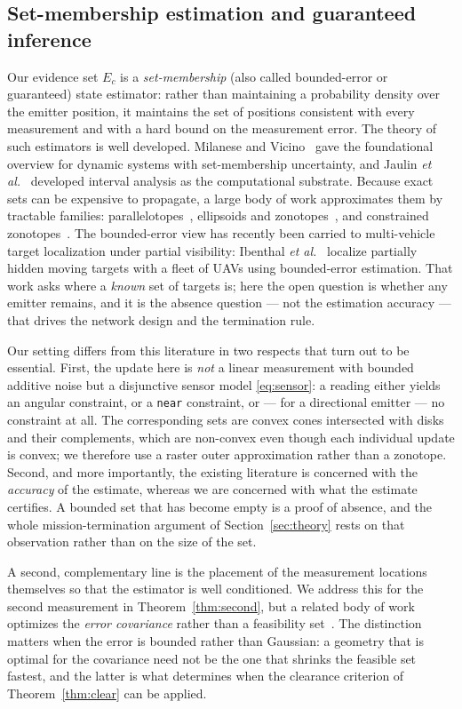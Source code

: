 \documentclass[preprint,12pt,3p]{elsarticle}
\theoremstyle{definition}
\begin{document}
\subsection{Set-membership estimation and guaranteed inference}
\label{sec:relset}
Our evidence set $E_c$ is a \emph{set-membership} (also called bounded-error or guaranteed)
state estimator: rather than maintaining a probability density over the emitter position, it
maintains the set of positions consistent with every measurement and with a hard bound on the
measurement error. The theory of such estimators is well developed. Milanese and
Vicino~\cite{milanese1991} gave the foundational overview for dynamic systems with set-membership
uncertainty, and Jaulin \emph{et al.}~\cite{jaulin2001} developed interval analysis as the
computational substrate. Because exact sets can be expensive to propagate, a large body of work
approximates them by tractable families: parallelotopes~\cite{chisci1996}, ellipsoids and
zonotopes~\cite{alamo2005,combastel2003}, and constrained zonotopes~\cite{scott2016}. The
bounded-error view has recently been carried to multi-vehicle target localization under
partial visibility: Ibenthal \emph{et al.}~\cite{ibenthal2023} localize partially hidden
moving targets with a fleet of UAVs using bounded-error estimation. That work asks where a
\emph{known} set of targets is; here the open question is whether any emitter remains, and it
is the absence question --- not the estimation accuracy --- that drives the network design and
the termination rule.

Our setting differs from this literature in two respects that turn out to be essential. First,
the update here is \emph{not} a linear measurement with bounded additive noise but a disjunctive
sensor model \eqref{eq:sensor}: a reading either yields an angular constraint, or a
\texttt{near} constraint, or --- for a directional emitter --- no constraint at all. The
corresponding sets are convex cones intersected with disks and their complements, which are
non-convex even though each individual update is convex; we therefore use a raster outer
approximation rather than a zonotope. Second, and more importantly, the existing literature is
concerned with the \emph{accuracy} of the estimate, whereas we are concerned with what the
estimate certifies. A bounded set that has become empty is a proof of absence, and the whole
mission-termination argument of Section~\ref{sec:theory} rests on that observation rather than on
the size of the set.

A second, complementary line is the placement of the measurement locations themselves so that the
estimator is well conditioned. We address this for the second measurement in
Theorem~\ref{thm:second}, but a related body of work optimizes the \emph{error covariance} rather
than a feasibility set~\cite{bishop2010,martinez2006}. The distinction matters when the error is
bounded rather than Gaussian: a geometry that is optimal for the covariance need not be the one
that shrinks the feasible set fastest, and the latter is what determines when the clearance
criterion of Theorem~\ref{thm:clear} can be applied.
\end{document}
